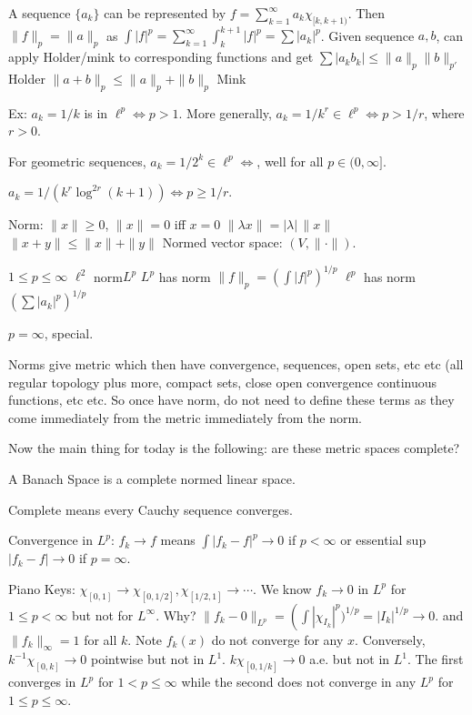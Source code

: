 A sequence $\{a_k\}$ can be represented by $f= \sum_{k=1}^\infty a_k \chi_{[k,k+1)}$. Then $\|f\|_p= \|a\|_p$ as $\int |f|^p= \sum_{k=1}^\infty \int_k^{k+1} |f|^p = \sum |a_k|^p$. Given sequence $a,b$, can apply Holder/mink to corresponding functions and get 
$\sum |a_kb_k| \leq \|a\|_p \|b\|_{p'}$ Holder
$\|a+b\|_p \leq \|a\|_p + \|b\|_p$ Mink

Ex: $a_k=1/k$ is in $\ell^p \iff p>1$. More generally, $a_k= 1/k^r \in \ell^p \iff p>1/r$, where $r>0$.

For geometric sequences, $a_k= 1/2^k \in \ell^p \iff $, well for all $p \in (0,\infty]$. 

$a_k= 1/(k^r \log^{2r}(k+1)) \iff p \geq 1/r$. 



Norm: $\|x\| \geq 0$, $\|x\|=0$ iff $x=0$
$\| \lambda x\|= |\lambda| \, \|x\|$
$\|x+y\| \leq \|x\|+\|y\|$
Normed vector space: $(V, \|\cdot\|)$. 

$1 \leq p \leq \infty$
$\ell^2$ norm$L^p$ 
$L^p$ has norm $\|f\|_p= \left(\int |f|^p \right)^{1/p}$
$\ell^p$ has norm $\left( \sum |a_k|^p \right)^{1/p}$

$p=\infty$, special.


Norms give metric which then have convergence, sequences, open sets, etc etc (all regular topology plus more, compact sets, close open convergence continuous functions, etc etc. So once have norm, do not need to define these terms as they come immediately from the metric immediately from the norm. 

Now the main thing for today is the following: are these metric spaces complete?

\begin{dfn}
A Banach Space is a complete normed linear space.
\end{dfn}

Complete means every Cauchy sequence converges. 



Convergence in $L^p$: $f_k \to f$ means $\int |f_k-f|^p \to 0$ if $p<\infty$ or essential sup $|f_k-f| \to 0$ if $p= \infty$. 


\begin{ex}
Piano Keys: $\chi_{[0,1]} \to \chi_{[0,1/2]}, \chi_{[1/2,1]}  \to \cdots$. We know $f_k \to 0$ in $L^p$ for $1 \leq p < \infty$ but not for $L^\infty$. Why? $\|f_k-0\|_{L^p}= \left(\int |\chi_{I_k}|^p)^{1/p}= |I_k|^{1/p} \to 0$. and $\|f_k\|_\infty=1$ for all $k$. Note $f_k(x)$ do not converge for any $x$. 
%
Conversely, $k^{-1} \chi_{[0,k]} \to 0$ pointwise but not in $L^1$. $k \chi_{[0,1/k]} \to 0$ a.e. but not in $L^1$. The first converges in $L^p$ for $1<p \leq \infty$ while the second does not converge in any $L^p$ for $1 \leq p \leq \infty$. 

\end{ex}

